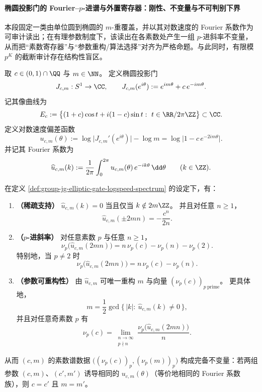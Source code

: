 \paragraph{椭圆投影门的 Fourier--\(p\)-进谱与外置寄存器：刚性、不变量与不可判别下界}
本段固定一类由单位圆到椭圆的 \(m\)-重覆盖，并以其对数速度的 Fourier 系数作为可审计读出；在有理参数制度下，该读出在各素数处产生一组 \(p\)-进斜率不变量，从而把“素数寄存器”与“参数重构/算法选择”对齐为严格命题。与此同时，有限模 \(p^K\) 的截断审计存在结构性盲区。

\begin{definition}[椭圆投影门与对数速度谱]\label{def:group-jg-elliptic-gate-logspeed-spectrum}
取 \(c\in(0,1)\cap\QQ\) 与 \(m\in\NN\)。
定义椭圆投影门
\[
J_{c,m}:S^1\to\CC,\qquad
J_{c,m}(e^{i\theta}):=e^{im\theta}+c\,e^{-im\theta}.
\]
记其像曲线为
\[
E_c:=\bigl\{(1+c)\cos t+i(1-c)\sin t:\ t\in\RR/2\pi\ZZ\bigr\}\subset\CC.
\]
定义对数速度偏差函数
\[
u_{c,m}(\theta):=\log\bigl|J_{c,m}'(e^{i\theta})\bigr|-\log m
=\log\bigl|1-c\,e^{-2im\theta}\bigr|.
\]
并记其 Fourier 系数为
\[
\widehat u_{c,m}(k):=\frac{1}{2\pi}\int_{0}^{2\pi}u_{c,m}(\theta)\,e^{-ik\theta}\,\dd\theta\qquad(k\in\ZZ).
\]
\end{definition}

\begin{theorem}\label{thm:group-jg-elliptic-gate-prime-spectrum-rigidity}
在定义 \ref{def:group-jg-elliptic-gate-logspeed-spectrum} 的设定下，有：
\begin{enumerate}
  \item \textbf{（稀疏支持）}
  \(\widehat u_{c,m}(k)=0\) 当且仅当 \(k\notin 2m\ZZ\)。
  并且对任意 \(n\ge 1\)，
  \[
  \widehat u_{c,m}(\pm 2mn)=-\frac{c^n}{2n}.
  \]
  \item \textbf{（\(p\)-进斜率）}
  对任意素数 \(p\) 与任意 \(n\ge 1\)，
  \[
  \nu_p\!\bigl(\widehat u_{c,m}(2mn)\bigr)=n\,\nu_p(c)-\nu_p(n)-\nu_p(2).
  \]
  特别地，当 \(p\neq 2\) 时
  \[
  \nu_p\!\bigl(\widehat u_{c,m}(2mn)\bigr)=n\,\nu_p(c)-\nu_p(n).
  \]
  \item \textbf{（参数可重构性）}
  由 \(\widehat u_{c,m}\) 可唯一重构 \(m\) 与向量 \((\nu_p(c))_{p\ \mathrm{prime}}\)。
  更具体地，
  \[
  m=\frac12\gcd\{\,|k|:\ \widehat u_{c,m}(k)\neq 0\,\},
  \]
  并且对任意奇素数 \(p\) 有
  \[
  \nu_p(c)=
  \lim_{\substack{n\to\infty\\ p\nmid n}}
  \frac{\nu_p\!\bigl(\widehat u_{c,m}(2mn)\bigr)}{n}.
  \]
\end{enumerate}
从而 \((c,m)\) 的素数谱数据 \(\bigl((\nu_p(c))_p,(\nu_p(m))_p\bigr)\) 构成完备不变量：若两组参数 \((c,m)\)、\((c',m')\) 诱导相同的 \(u_{c,m}(\theta)\)（等价地相同的 Fourier 系数族），则 \(c=c'\) 且 \(m=m'\)。
\end{theorem}

